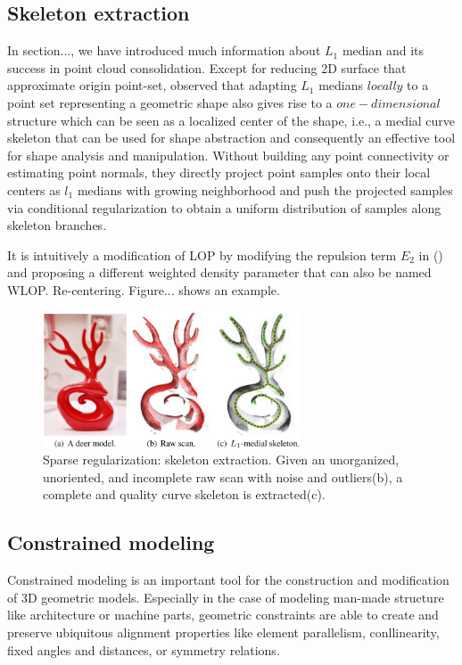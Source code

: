 \subsection{Skeleton extraction}
In section..., we have introduced much information about $L_1$ median and its success in point cloud consolidation.
Except for reducing 2D surface that approximate origin point-set, \cite{huang2013l1} observed that adapting $L_1$ medians $locally$ to a point set representing a geometric shape also gives rise to a $one-dimensional$ structure which can be seen as a localized center of the shape, i.e., a medial curve skeleton that can be used for shape abstraction and consequently an effective tool for shape analysis and manipulation\cite{cornea2007curve}.
Without building any point connectivity or estimating point normals, they directly project point samples onto their local centers as $l_1$ medians with growing neighborhood and push the projected samples via conditional regularization to obtain a uniform distribution of samples along skeleton branches.

It is intuitively a modification of LOP by modifying the repulsion term $E_2$ in () and proposing a different weighted density parameter that can also be named WLOP\cite{huang2009consolidation}. Re-centering. Figure... shows an example.

\begin{figure}[ht]
  \centering
  \includegraphics[width=3in]{images/skeleton_L1}
  \caption{Sparse regularization: skeleton extraction\cite{huang2013l1}. Given an unorganized, unoriented, and incomplete raw scan with noise and outliers(b), a complete and quality curve skeleton is extracted(c).}
\end{figure}


\subsection{Constrained modeling}
Constrained modeling is an important tool for the construction and modification of 3D geometric models.
Especially in the case of modeling man-made structure like architecture or machine parts, geometric constraints are able to create and preserve ubiquitous alignment properties like element parallelism, conllinearity, fixed angles and distances, or symmetry relations.

